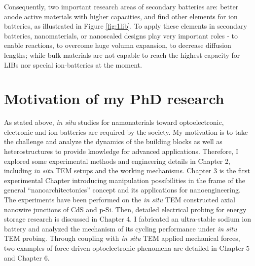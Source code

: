 Consequently, two important research areas of secondary batteries are: better anode active materials with higher capacities, and find other elements for ion batteries, as illustrated in Figure \ref{fig:1lib}. To apply these elements in secondary batteries, nanomaterials, or nanoscaled designs play very important roles - to enable reactions, to overcome huge volumn expansion, to decrease diffusion lengths; while bulk materials are not capable to reach the highest capacity for LIBs nor special ion-batteries at the moment. 

\section{Motivation of my PhD research}
As stated above, {\em in situ} studies for namonaterials toward optoelectronic, electronic and ion batteries are required by the society. My motivation is to take the challenge and analyze the dynamics of the building blocks as well as heterostructures to provide knowledge for advanced applications. 
Therefore, I explored some experimental methods and engineering details in Chapter 2, including {\em in situ} TEM setups and the working mechanisms. Chapter 3 is the first experimental Chapter introducing manipulation possibilities in the frame of the general “nanoarchitectonics” concept and its applications for nanoengineering. The experiments have been performed on the {\em in situ} TEM constructed axial nanowire junctions of CdS and p-Si. Then, detailed electrical probing for energy storage research is discussed in Chapter 4. I fabricated an ultra-stable sodium ion battery and analyzed the mechanism of its cycling performance under {\em in situ} TEM probing. Through coupling with {\em in situ} TEM applied mechanical forces, two examples of force driven optoelectronic phenomena are detailed in Chapter 5 and Chapter 6. 
